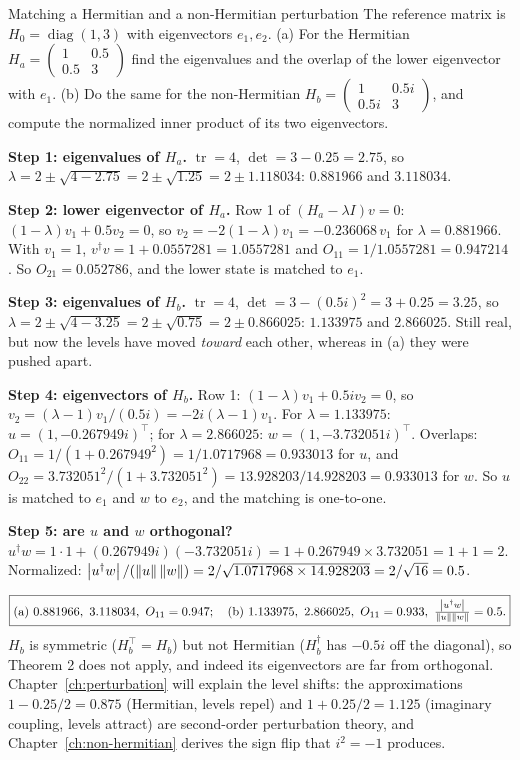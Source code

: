 \begin{sample}{Matching a Hermitian and a non-Hermitian perturbation}
The reference matrix is $H_0=\operatorname{diag}(1,3)$ with eigenvectors $e_1,e_2$. (a) For the Hermitian $H_a=\begin{pmatrix}1&0.5\\0.5&3\end{pmatrix}$ find the eigenvalues and the overlap of the lower eigenvector with $e_1$. (b) Do the same for the non-Hermitian $H_b=\begin{pmatrix}1&0.5i\\0.5i&3\end{pmatrix}$, and compute the normalized inner product of its two eigenvectors.

\textbf{Step 1: eigenvalues of $H_a$.} $\operatorname{tr}=4$, $\det=3-0.25=2.75$, so $\lambda=2\pm\sqrt{4-2.75}=2\pm\sqrt{1.25}=2\pm1.118034$: $0.881966$ and $3.118034$.

\textbf{Step 2: lower eigenvector of $H_a$.} Row 1 of $(H_a-\lambda I)v=0$: $(1-\lambda)v_1+0.5v_2=0$, so $v_2=-2(1-\lambda)v_1=-0.236068\,v_1$ for $\lambda=0.881966$. With $v_1=1$, $v^\dagger v=1+0.0557281=1.0557281$ and $O_{11}=1/1.0557281=0.947214$. So $O_{21}=0.052786$, and the lower state is matched to $e_1$.

\textbf{Step 3: eigenvalues of $H_b$.} $\operatorname{tr}=4$, $\det=3-(0.5i)^2=3+0.25=3.25$, so $\lambda=2\pm\sqrt{4-3.25}=2\pm\sqrt{0.75}=2\pm0.866025$: $1.133975$ and $2.866025$. Still real, but now the levels have moved \emph{toward} each other, whereas in (a) they were pushed apart.

\textbf{Step 4: eigenvectors of $H_b$.} Row 1: $(1-\lambda)v_1+0.5iv_2=0$, so $v_2=(\lambda-1)v_1/(0.5i)=-2i(\lambda-1)v_1$. For $\lambda=1.133975$: $u=(1,-0.267949i)^\top$; for $\lambda=2.866025$: $w=(1,-3.732051i)^\top$. Overlaps: $O_{11}=1/(1+0.267949^2)=1/1.0717968=0.933013$ for $u$, and $O_{22}=3.732051^2/(1+3.732051^2)=13.928203/14.928203=0.933013$ for $w$. So $u$ is matched to $e_1$ and $w$ to $e_2$, and the matching is one-to-one.

\textbf{Step 5: are $u$ and $w$ orthogonal?} $u^\dagger w=1\cdot1+(0.267949i)(-3.732051i)=1+0.267949\times3.732051=1+1=2$. Normalized: $\left\lvert u^\dagger w\right\rvert/(\left\lVert u\right\rVert\left\lVert w\right\rVert)=2/\sqrt{1.0717968\times14.928203}=2/\sqrt{16}=0.5$.

\[
\boxed{\text{(a) }0.881966,\ 3.118034,\ O_{11}=0.947;\quad\text{(b) }1.133975,\ 2.866025,\ O_{11}=0.933,\ \tfrac{\abs{u^\dagger w}}{\norm u\norm w}=0.5.}
\]
$H_b$ is symmetric ($H_b^\top=H_b$) but not Hermitian ($H_b^\dagger$ has $-0.5i$ off the diagonal), so Theorem 2 does not apply, and indeed its eigenvectors are far from orthogonal. Chapter~\ref{ch:perturbation} will explain the level shifts: the approximations $1-0.25/2=0.875$ (Hermitian, levels repel) and $1+0.25/2=1.125$ (imaginary coupling, levels attract) are second-order perturbation theory, and Chapter~\ref{ch:non-hermitian} derives the sign flip that $i^2=-1$ produces.
\end{sample}


